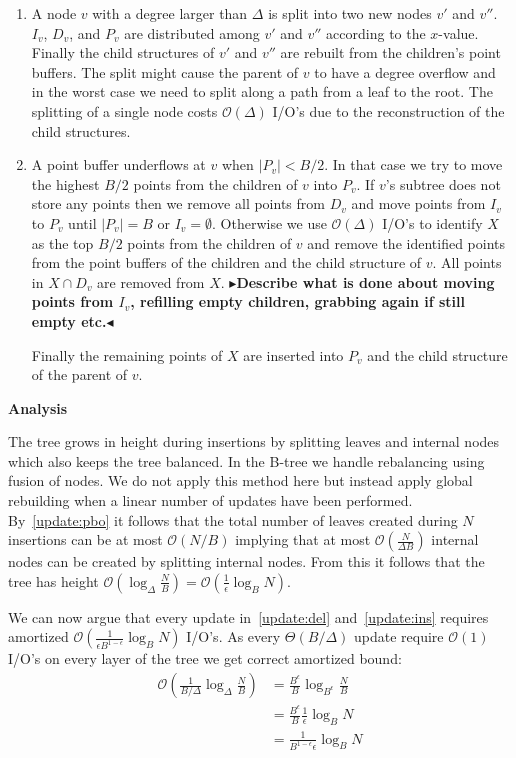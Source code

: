 \documentclass[twoside,11pt,openright]{report}
\newcommand{\todo}[1]{{\color[rgb]{.5,0,0}\textbf{$\blacktriangleright$#1$\blacktriangleleft$}}}
\begin{document}
\begin{enumerate}[label=(\roman*)]
	\item\label{update:deg} A node $v$ with a degree larger than $\Delta$ is split into two new nodes $v'$ and $v''$. $I_v$, $D_v$, and $P_v$ are distributed among $v'$ and $v''$ according to the $x$-value. Finally the child structures of $v'$ and $v''$ are rebuilt from the children's point buffers. The split might cause the parent of $v$ to have a degree overflow and in the worst case we need to split along a path from a leaf to the root. The splitting of a single node costs $\mathcal{O}(\Delta)$ I/O's due to the reconstruction of the child structures.
	
	\item\label{update:pbu} A point buffer underflows at $v$ when $\vert P_v \vert < B/2$. In that case we try to move the highest $B/2$ points from the children of $v$ into $P_v$. If $v$'s subtree does not store any points then we remove all points from $D_v$ and move points from $I_v$ to $P_v$ until $\vert P_v \vert = B$ or $I_v = \emptyset$.
	Otherwise we use $\mathcal{O}(\Delta)$ I/O's to identify $X$ as the top $B/2$ points from the children of $v$ and remove the identified points from the point buffers of the children and the child structure of $v$.
	All points in $X \cap D_v$ are removed from $X$.
	\todo{Describe what is done about moving points from $I_v$, refilling empty children, grabbing again if still empty etc.}
	
	Finally the remaining points of $X$ are inserted into $P_v$ and the child structure of the parent of $v$.
\end{enumerate}

\textbf{Analysis}

The tree grows in height during insertions by splitting leaves and internal nodes which also keeps the tree balanced. In the B-tree we handle rebalancing using fusion of nodes. We do not apply this method here but instead apply global rebuilding when a linear number of updates have been performed. By~\ref{update:pbo} it follows that the total number of leaves created during $N$ insertions can be at most $\mathcal{O}(N/B)$ implying that at most $\mathcal{O}(\frac{N}{\Delta B})$ internal nodes can be created by splitting internal nodes. From this it follows that the tree has height $\mathcal{O}(\log_\Delta \frac{N}{B}) = \mathcal{O}(\frac{1}{\epsilon} \log_B N)$.

We can now argue that every update in~\ref{update:del} and~\ref{update:ins} requires amortized $\mathcal{O}(\frac{1}{\epsilon B^{1-\epsilon}} \log_B N)$ I/O's. As every $\Theta (B/\Delta)$ update require $\mathcal{O}(1)$ I/O's on every layer of the tree we get correct amortized bound:
\begin{align*}
\mathcal{O}(\frac{1}{B/\Delta} \log_\Delta \frac{N}{B}) &= \frac{B^\epsilon}{B} \log_{B^\epsilon} \frac{N}{B} \\
&= \frac{B^\epsilon}{B} \frac{1}{\epsilon} \log_{B} N \\
&= \frac{1}{B^{1-\epsilon}\epsilon} \log_B N
\end{align*}
\end{document}
